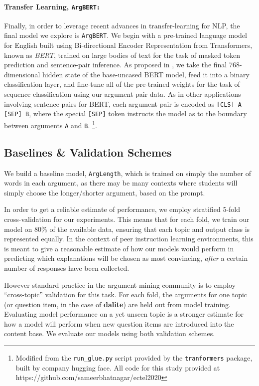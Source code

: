 \documentclass[runningheads]{llncs}
\begin{document}
\paragraph{\textbf{Transfer Learning, \tt{ArgBERT}:}}
Finally, in order to leverage recent advances in transfer-learning for NLP, the 
final model we explore is \verb|ArgBERT|.
We begin with a pre-trained language model for English built using  
Bi-directional Encoder Representation from Transformers, known as 
\textit{BERT}\cite{devlin_bert_2018}, trained on large bodies of text for the 
task of masked token prediction and sentence-pair inference. 
As proposed in \cite{toledo_automatic_2019}, we take the final 768-dimensional 
hidden state of the base-uncased BERT model, feed it into a binary 
classification layer, and fine-tune all of the pre-trained weights for the task 
of sequence classification using our argument-pair data. 
As in other applications involving sentence pairs for BERT, each argument pair 
is encoded as \verb|[CLS] A [SEP] B|, where the special \verb|[SEP]| token 
instructs the model as to the boundary between arguments \verb|A| and \verb|B|. 
\footnote{Modified from the \verb|run_glue.py| 
script provided by the \verb|tranformers| package, built by company hugging 
face. All code for this study provided at 
https://github.com/sameerbhatnagar/ectel2020}.

\subsection{Baselines \& Validation Schemes}

We build a baseline model, \verb|ArgLength|, which is trained 
on simply the number of words in each argument, as there may be many contexts 
where students will simply choose the longer/shorter argument, based on the 
prompt. 

In order to get a reliable estimate of performance, we employ stratified 5-fold 
cross-validation for our experiments.
This means that for each fold, we train our model on 80\% of the available 
data, ensuring that each topic and output class is represented equally. 
In the context of peer instruction learning environments, this is meant to give 
a reasonable estimate of how our models would perform in predicting which 
explanations will be chosen as most convincing, \textit{after} a certain number 
of responses have been collected.
 
However standard practice in the argument mining community is to employ 
``cross-topic'' validation for this task. 
For each fold, the arguments for one topic (or question item, in the case of 
\textbf{dalite}) are held out from model training.
Evaluating model performance on a yet unseen topic is a stronger estimate for 
how a model will perform when new question items are introduced into the 
content base.
We evaluate our models using both validation schemes.
\end{document}

